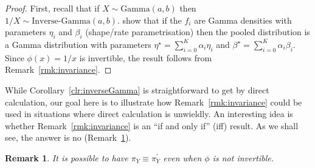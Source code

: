 \documentclass[a4paper, notitlepage, 10pt]{article}
\newtheorem{remark}{Remark}[]
\begin{document}
\begin{proof}
First, recall that if $X \sim \text{Gamma}(a, b)$ then $ 1/X \sim \text{Inverse-Gamma}(a, b)$.
\cite{Carvalho2019} show that if the $f_i$ are Gamma densities  with parameters $\eta_i$ and $\beta_i$ (shape/rate parametrisation) then the pooled distribution is a Gamma distribution with parameters $\eta^\star = \sum_{i = 0}^K \alpha_i \eta_i$ and $\beta^\star = \sum_{i = 0}^K \alpha_i \beta_i$.
Since $\phi(x) = 1/x$ is invertible, the result follows from Remark~\ref{rmk:invariance}.
\end{proof}
While Corollary~\ref{clr:inverseGamma} is straightforward to get by direct calculation, our goal here is to illustrate how Remark~\ref{rmk:invariance} could be used in situations where direct calculation is unwieldly.
An interesting idea is whether Remark~\ref{rmk:invariance} is an ``if and only if'' (iff) result.
As we shall see, the answer is no (Remark~\ref{rmk:invertibleIFF}).
\begin{remark}
 \label{rmk:invertibleIFF}
 It is possible to have  $\pi_Y \equiv \pi_Y^{\prime}$ even when $\phi$ is not invertible.
\end{remark}
\end{document}
